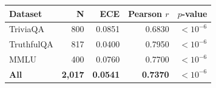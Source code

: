 \begin{tabular}{lrrrr}
\toprule
Dataset & N & ECE & Pearson $r$ & $p$-value \\
\midrule
TriviaQA & 800 & 0.0851 & 0.6830 & $<10^{-6}$ \\
TruthfulQA & 817 & 0.0400 & 0.7950 & $<10^{-6}$ \\
MMLU & 400 & 0.0760 & 0.7700 & $<10^{-6}$ \\
\textbf{All} & \textbf{2,017} & \textbf{0.0541} & \textbf{0.7370} & $<10^{-6}$ \\
\bottomrule
\end{tabular}
